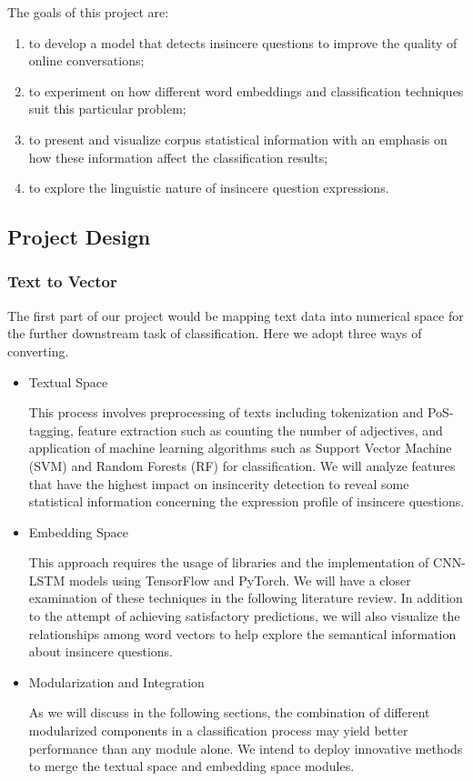 \documentclass[12pt]{diazessay} %
\begin{document}
The goals of this project are: 
\begin{enumerate}
\item to develop a model that detects insincere questions to improve the quality of online conversations; 
\item to experiment on how different word embeddings and classification techniques suit this particular problem; 
\item to present and visualize corpus statistical information with an emphasis on how these information affect the classification results; 
\item to explore the linguistic nature of insincere question expressions. 
\end{enumerate}

\subsection{Project Design}

\subsubsection{Text to Vector}

The first part of our project would be mapping text data into numerical space for the further downstream task of classification. Here we adopt three ways of converting.

\begin{itemize}
	\item Textual Space

This process involves preprocessing of texts including tokenization and PoS-tagging, feature extraction such as counting the number of adjectives, and application of machine learning algorithms such as Support Vector Machine (SVM) and Random Forests (RF) for classification. We will analyze features that have the highest impact on insincerity detection to reveal some statistical information concerning the expression profile of insincere questions. 

	\item Embedding Space

This approach requires the usage of libraries and the implementation of CNN-LSTM models using TensorFlow and PyTorch. We will have a closer examination of these techniques in the following literature review. In addition to the attempt of achieving satisfactory predictions, we will also visualize the relationships among word vectors to help explore the semantical information about insincere questions.

	\item Modularization and Integration

As we will discuss in the following sections, the combination of different modularized components in a classification process may yield better performance than any module alone. We intend to deploy innovative methods to merge the textual space and embedding space modules. 	
\end{itemize}
\end{document}
